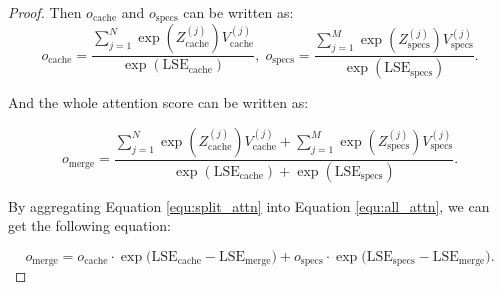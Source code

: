 \begin{proof}




Then $o_{\mathrm{cache}}$ and $o_{\mathrm{specs}}$ can be written as:
\begin{equation}
    \label{equ:split_attn}
    o_{\mathrm{cache}} = \frac{\sum_{j=1}^{N} \exp\left(Z_{\mathrm{cache}}^{(j)}\right) V_{\mathrm{cache}}^{(j)}}{\exp\left(\mathrm{LSE}_{\mathrm{cache}}\right)}, \;
    o_{\mathrm{specs}} = \frac{\sum_{j=1}^{M} \exp\left(Z_{\mathrm{specs}}^{(j)}\right) V_{\mathrm{specs}}^{(j)}}{\exp\left(\mathrm{LSE}_{\mathrm{specs}}\right)}.
\end{equation}

And the whole attention score can be written as:

\begin{equation}
    \label{equ:all_attn}
    o_{\mathrm{merge}} =
    \frac{\sum_{j=1}^{N} \exp\left(Z_{\mathrm{cache}}^{(j)}\right) V_{\mathrm{cache}}^{(j)} + \sum_{j=1}^{M} \exp\left(Z_{\mathrm{specs}}^{(j)}\right) V_{\mathrm{specs}}^{(j)}}{\exp\left(\mathrm{LSE}_{\mathrm{cache}}\right) + \exp\left(\mathrm{LSE}_{\mathrm{specs}}\right)}.
\end{equation}

By aggregating Equation \ref{equ:split_attn} into Equation \ref{equ:all_attn}, we can get the following equation:

\begin{equation}
    o_{\mathrm{merge}} = o_{\mathrm{cache}} \cdot\exp\bigl(\mathrm{LSE}_{\mathrm{cache}} - \mathrm{LSE}_{\mathrm{merge}}\bigr)
     + o_{\mathrm{specs}} \cdot \exp\bigl(\mathrm{LSE}_{\mathrm{specs}} - \mathrm{LSE}_{\mathrm{merge}}\bigr).
\end{equation}

\end{proof}